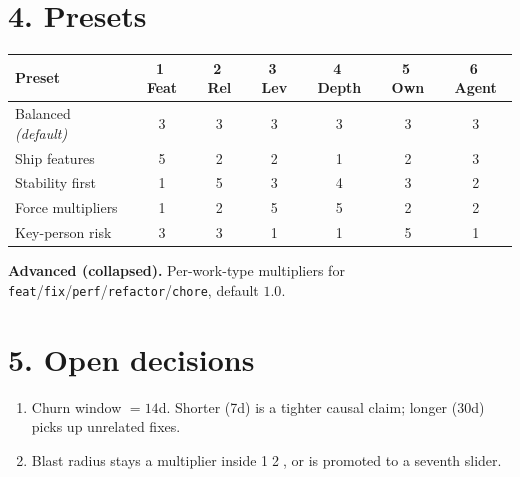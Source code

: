 \documentclass[11pt]{article}
\begin{document}
\section*{4. Presets}
\begin{tabular}{@{}lcccccc@{}}
\toprule
\textbf{Preset} & \textcircled{1} Feat & \textcircled{2} Rel & \textcircled{3} Lev & \textcircled{4} Depth & \textcircled{5} Own & \textcircled{6} Agent\\
\midrule
Balanced \emph{(default)} & 3 & 3 & 3 & 3 & 3 & 3\\
Ship features & 5 & 2 & 2 & 1 & 2 & 3\\
Stability first & 1 & 5 & 3 & 4 & 3 & 2\\
Force multipliers & 1 & 2 & 5 & 5 & 2 & 2\\
Key-person risk & 3 & 3 & 1 & 1 & 5 & 1\\
\bottomrule
\end{tabular}

\medskip
\noindent\textbf{Advanced (collapsed).} Per-work-type multipliers for
\texttt{feat}/\texttt{fix}/\texttt{perf}/\texttt{refactor}/\texttt{chore}, default $1.0$.

\section*{5. Open decisions}
\begin{enumerate}[leftmargin=*]
  \item Churn window $=14$d. Shorter (7d) is a tighter causal claim; longer (30d) picks up unrelated fixes.
  \item Blast radius stays a multiplier inside \textcircled{1}\textcircled{2}, or is promoted to a seventh slider.
\end{enumerate}
\end{document}
